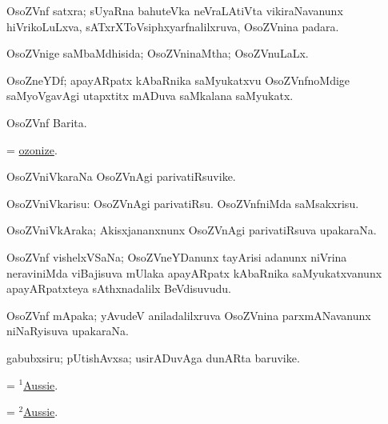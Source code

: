 \bentry
{}
\gl{\nA}
\bmng
OsoZVnf satxra; sUyaRna bahuteVka neVraLAtiVta vikiraNavanunx hiVrikoLuLxva, sATxrXToVsiphxyarfnalilxruva, OsoZVnina padara. 
\emng
\eentry

\bentry
{}
\gl{\gu}
\bmng
OsoZVnige saMbaMdhisida; OsoZVninaMtha; OsoZVnuLaLx. 
\emng
\eentry

\bentry
{}
\gl{\nA}
\bmng
OsoZneYDf; apayARpatx kAbaRnika saMyukatxvu OsoZVnfnoMdige saMyoVgavAgi utapxtitx mADuva saMkalana saMyukatx. 
\emng
\eentry

\bentry
{}
\gl{\gu}
\bmng
OsoZVnf Barita. 
\emng
\eentry

\bentry
{}
\gl{\sakirx}
\bmng
= \hyperlink{ozonize}{ozonize}. 
\emng
\eentry

\bentry
{}
\gl{\nA}
\bmng
OsoZVniVkaraNa OsoZVnAgi parivatiRsuvike. 
\emng
\eentry

\bentry
{}
\gl{\sakirx}
\bmng
OsoZVniVkarisu: 
\banum
{} OsoZVnAgi parivatiRsu. 
 OsoZVnfniMda saMsakxrisu. 
\eanum
\emng
\eentry

\bentry
{}
\gl{\nA}
\bmng
OsoZVniVkAraka; Akisxjananxnunx OsoZVnAgi parivatiRsuva upakaraNa. 
\emng
\eentry

\bentry
{}
\gl{\nA}
\bmng
OsoZVnf vishelxVSaNa; OsoZVneYDanunx tayArisi adanunx niVrina neraviniMda viBajisuva mUlaka apayARpatx kAbaRnika saMyukatxvanunx apayARpatxteya sAthxnadalilx BeVdisuvudu. 
\emng
\eentry

\bentry
{}
\gl{\nA}
\bmng
OsoZVnf mApaka; yAvudeV aniladalilxruva OsoZVnina parxmANavanunx niNaRyisuva upakaraNa. 
\emng
\eentry

\bentry
{}
\gl{\nA}
\bmng
gabubxsiru; pUtishAvxsa; usirADuvAga dunARta baruvike. 
\emng
\eentry

\bentry
{}
\gl{\nA}
\bmng
= \hyperref{kandict_a.pdf}{A}{Aussie(1)}{$^1$Aussie}. 
\emng
\eentry

\bentry
{}
\gl{\gu}
\bmng
= \hyperref{kandict_a.pdf}{A}{Aussie(2)}{$^2$Aussie}. 
\emng
\eentry


%
